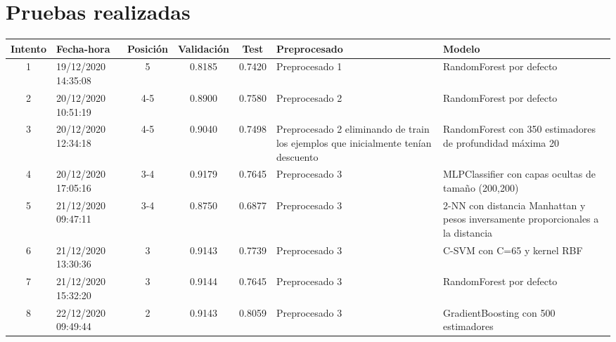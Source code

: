 \documentclass{article}
\begin{document}
\section{Pruebas realizadas}
\setlength\LTleft{-0.5in}
\setlength\LTright{-2in}
\begin{longtable}{|c|C{2.1cm}|c|c|c|C{4cm}|C{6cm}|}
\toprule
Intento & Fecha-hora & Posición & Validación & Test & Preprocesado & Modelo \\

\midrule

1 & 19/12/2020 14:35:08 & 5 & 0.8185 & 0.7420 & Preprocesado 1 & RandomForest por defecto \\

\midrule

2 & 20/12/2020 10:51:19 & 4-5 & 0.8900 & 0.7580 & Preprocesado 2 & RandomForest por defecto \\

\midrule

3 & 20/12/2020 12:34:18 & 4-5 & 0.9040 & 0.7498 & Preprocesado 2 eliminando de train los ejemplos que inicialmente tenían descuento & RandomForest con 350 estimadores de profundidad máxima 20 \\

\midrule

4 & 20/12/2020 17:05:16 & 3-4 & 0.9179 & 0.7645 & Preprocesado 3 & MLPClassifier con capas ocultas de tamaño (200,200) \\

\midrule

5 & 21/12/2020 09:47:11 & 3-4 & 0.8750 & 0.6877 & Preprocesado 3 & 2-NN con distancia Manhattan y pesos inversamente proporcionales a la distancia \\

\midrule

6 & 21/12/2020 13:30:36 & 3 & 0.9143 & 0.7739 & Preprocesado 3 & C-SVM con C=65 y kernel RBF \\

\midrule

7 & 21/12/2020 15:32:20 & 3 & 0.9144 & 0.7645 & Preprocesado 3 & RandomForest por defecto \\

\midrule

8 & 22/12/2020 09:49:44 & 2 & 0.9143 & 0.8059 & Preprocesado 3 & GradientBoosting con 500 estimadores \\


\end{longtable}
\end{document}
